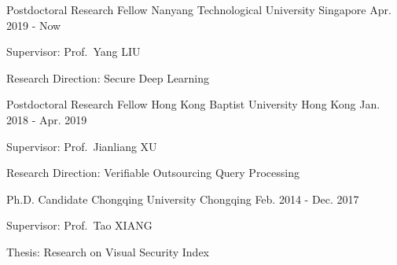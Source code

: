 

\begin{cventries}
    \cventry%
    {Postdoctoral Research Fellow}
    {Nanyang Technological University}
    {Singapore}
    {Apr. 2019 - Now} %
    {
        \begin{cvitems}
            \item{Supervisor: Prof.\ Yang LIU}
            \item{Research Direction: Secure Deep Learning}
        \end{cvitems}
    }
    \cventry%
    {Postdoctoral Research Fellow}
    {Hong Kong Baptist University}
    {Hong Kong}
    {Jan. 2018 - Apr. 2019} %
    {
        \begin{cvitems}
            \item{Supervisor: Prof.\ Jianliang XU}
            \item{Research Direction: Verifiable Outsourcing Query Processing}
        \end{cvitems}
    }
	\cventry%
	{Ph.D. Candidate}
	{Chongqing University}
	{Chongqing}
	{Feb. 2014 - Dec. 2017} %
	{
		\begin{cvitems}
			\item{Supervisor: Prof.\ Tao XIANG}
			\item{Thesis: Research on Visual Security Index}
		\end{cvitems}
	}
\end{cventries}
\vspace{-0.2cm}
